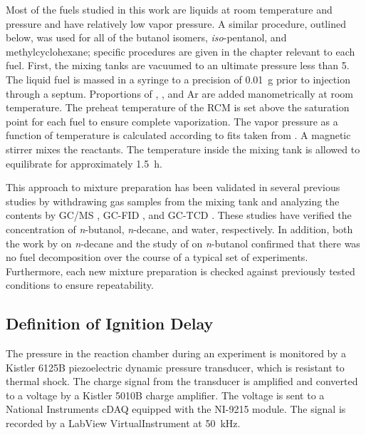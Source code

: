 \documentclass[../main.tex]{subfiles}
\begin{document}
Most of the fuels studied in this work are liquids at room temperature and
pressure and have relatively low vapor pressure. A similar procedure, outlined
below, was used for all of the butanol isomers, \textit{iso}-pentanol, and
methylcyclohexane; specific procedures are given in the chapter relevant to
each fuel. First, the mixing tanks are vacuumed to an ultimate pressure
less than \SI{5}{\torr}. The liquid fuel is massed in a syringe to a precision of
\SI{0.01}{\gram} prior to injection through a septum. Proportions of , , and
Ar are added manometrically at room temperature. The preheat temperature of
the RCM is set above the saturation point for each fuel to ensure complete
vaporization. The vapor pressure as a function of temperature is calculated
according to fits taken from \textcite{Yaws1999}. A magnetic stirrer mixes
the reactants. The temperature inside the mixing tank is allowed to
equilibrate for approximately \SI{1.5}{\hour}.

This approach to mixture preparation has been validated in several previous
studies by withdrawing gas samples from the mixing tank and analyzing the
contents by GC/MS \cite{Weber2011}, GC-FID \cite{Kumar2009}, and GC-TCD
\cite{Das2012}. These studies have verified the concentration of
\textit{n}-butanol, \textit{n}-decane, and water, respectively. In addition,
both the work by \textcite{Kumar2009} on \textit{n}-decane and the study of
\textcite{Weber2011} on \textit{n}-butanol confirmed that there was no fuel
decomposition over the course of a typical set of experiments. Furthermore,
each new mixture preparation is checked against previously tested
conditions to ensure repeatability.

\subsection{Definition of Ignition Delay}
\label{sec:ign-delay-def}

The pressure in the reaction chamber during an experiment is monitored by a
Kistler 6125B piezoelectric dynamic pressure transducer, which is resistant to thermal shock. The charge signal from the
transducer is amplified and converted to a voltage by a Kistler 5010B charge amplifier.
The voltage is sent to a National Instruments cDAQ equipped with the NI-9215 module.
The signal is recorded by a LabView VirtualInstrument at \SI{50}{\kilo\hertz}.
\end{document}
